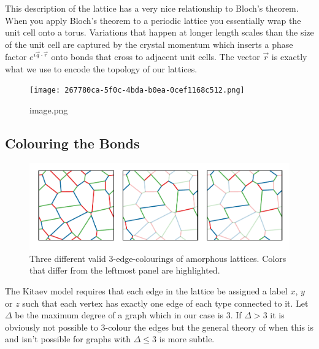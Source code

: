 This description of the lattice has a very nice relationship to Bloch's theorem. When you apply Bloch's theorem to a periodic lattice you essentially wrap the unit cell onto a torus. Variations that happen at longer length scales than the size of the unit cell are captured by the crystal momentum which inserts a phase factor \(e^{i \vec{q}\cdot\vec{r}}\) onto bonds that cross to adjacent unit cells. The vector \(\vec{r}\) is exactly what we use to encode the topology of our lattices.

\begin{fignos:no-prefix-figure-caption}

\begin{figure}
\centering
\texttt{[image: 267780ca-5f0c-4bda-b0ea-0cef1168c512.png]}
\caption{image.png}
\end{figure}

\end{fignos:no-prefix-figure-caption}

\hypertarget{colouring-the-bonds}{%
\subsection{Colouring the Bonds}\label{colouring-the-bonds}}

\begin{figure}
\hypertarget{fig:multiple_colourings}{%
\centering
\includegraphics[width=1\textwidth,height=\textheight]{figure_code/amk_chapter/multiple_colourings/multiple_colourings.pdf}
\caption{Three different valid 3-edge-colourings of amorphous lattices. Colors that differ from the leftmost panel are highlighted.}\label{fig:multiple_colourings}
}
\end{figure}

The Kitaev model requires that each edge in the lattice be assigned a label \(x\), \(y\) or \(z\) such that each vertex has exactly one edge of each type connected to it. Let \(\Delta\) be the maximum degree of a graph which in our case is 3. If \(\Delta > 3\) it is obviously not possible to 3-colour the edges but the general theory of when this is and isn't possible for graphs with \(\Delta \leq 3\) is more subtle.

